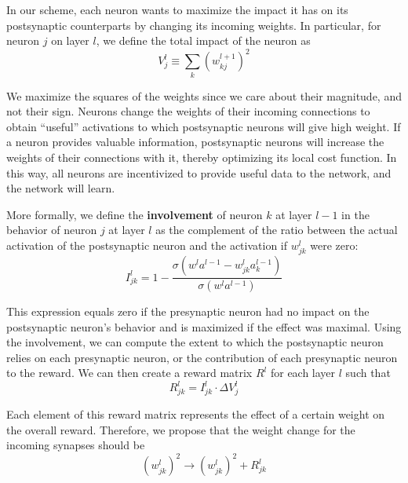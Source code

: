 \documentclass[12pt]{article}
\begin{document}
In our scheme, each neuron wants to maximize the impact it has on its postsynaptic counterparts by changing its incoming weights. In particular, for neuron $j$ on layer $l$, we define the total impact of the neuron as
\begin{equation}
	V^l_j \equiv \sum_k \left(w_{kj}^{l+1}\right)^2\label{eq3}
\end{equation}

We maximize the squares of the weights since we care about their magnitude, and not their sign. Neurons change the weights of their incoming connections to obtain ``useful'' activations to which postsynaptic neurons will give high weight. If a neuron provides valuable information, postsynaptic neurons will increase the weights of their connections with it, thereby optimizing its local cost function. In this way, all neurons are incentivized to provide useful data to the network, and the network will learn.

More formally, we define the \textbf{involvement} of neuron $k$ at layer $l-1$ in the behavior of neuron $j$ at layer $l$ as the complement of the ratio between the actual activation of the postsynaptic neuron and the activation if $w_{jk}^l$ were zero:
\begin{equation}
	I_{jk}^{l} = 1-\frac{\sigma\left(w^l a^{l-1} - w_{jk}^l a^{l-1}_k\right)}{\sigma\left(w^l a^{l-1}\right)}\label{eq4}
\end{equation}

This expression equals zero if the presynaptic neuron had no impact on the postsynaptic neuron's behavior and is maximized if the effect was maximal. Using the involvement, we can compute the extent to which the postsynaptic neuron relies on each presynaptic neuron, or the contribution of each presynaptic neuron to the reward. We can then create a reward matrix $R^l$ for each layer $l$ such that
\begin{equation}
	R_{jk}^l = I_{jk}^l \cdot\Delta V_j^l\label{eq5}
\end{equation}

Each element of this reward matrix represents the effect of a certain weight on the overall reward. Therefore, we propose that the weight change for the incoming synapses should be
\begin{equation}
	\left(w_{jk}^l\right)^2\rightarrow \left(w_{jk}^l\right)^2 + R_{jk}^l\label{eq6}
\end{equation}
\end{document}
